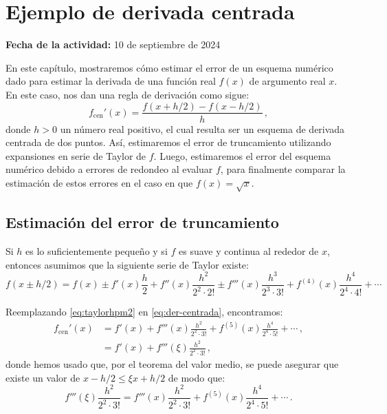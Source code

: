 \documentclass[../portafolio.tex]{subfiles}
\begin{document}
\chapter{Ejemplo de derivada centrada}
\label{ch:ejemplo-derivadas}
\hfill \textbf{Fecha de la actividad:} 10 de septiembre de 2024

\medskip

En este capítulo, mostraremos cómo estimar el error de un esquema
numérico dado para estimar la derivada de una función real $f(x)$ de
argumento real $x$. En este caso, nos dan una regla de derivación como
sigue:
\begin{equation}
  \label{eq:der-centrada}
  f_\text{cen}'(x) = \frac{f(x+h/2) - f(x-h/2)}{h}\,,
\end{equation}
%
donde $h>0$ un número real positivo, el cual resulta ser un esquema de
derivada centrada de dos puntos. Así, estimaremos el error de
truncamiento utilizando expansiones en serie de Taylor de $f$. Luego,
estimaremos el error del esquema numérico debido a errores de redondeo
al evaluar $f$, para finalmente comparar la estimación de estos
errores en el caso en que $f(x)=\sqrt{x}$.

\medskip

\section{Estimación del error de truncamiento}
Si $h$ es lo suficientemente pequeño y si $f$ es suave y continua al rededor de $x$, entonces asumimos que la siguiente serie de Taylor existe:
\begin{equation}
  \label{eq:taylorhpm2}
  f(x\pm h/2) =
  f(x) \pm f'(x) \frac{h}{2} + f''(x) \frac{h^2}{2^2 \cdot 2!}
  \pm f'''(x) \frac{h^3}{2^3\cdot 3!}
  +  f^{(4)}(x) \frac{h^4}{2^4\cdot 4!} + \cdots
\end{equation}

Reemplazando \eqref{eq:taylorhpm2} en \eqref{eq:der-centrada}, encontramos:
\begin{align}
  \label{eq:deriv-trunc}
  f_\text{cen}'(x)
  &=
  f'(x) + f'''(x) \frac{h^2}{2^2\cdot 3!}
  +
    f^{(5)}(x) \frac{h^4}{2^4\cdot 5!} + \cdots \,, \nonumber \\
  &=
    f'(x) + f'''(\xi) \frac{h^2}{2^2\cdot 3!} \,,
\end{align}
%
donde hemos usado que, por el teorema del valor medio, se puede asegurar que existe un valor de $x-h/2\leq \xi x+h/2$ de modo que:
\begin{equation}
  \label{eq:trunca}
  f'''(\xi) \frac{h^2}{2^2\cdot 3!}
  =
  f'''(x) \frac{h^2}{2^2\cdot 3!}
  +
  f^{(5)}(x) \frac{h^4}{2^4\cdot 5!} + \cdots \,.
\end{equation}
\end{document}
